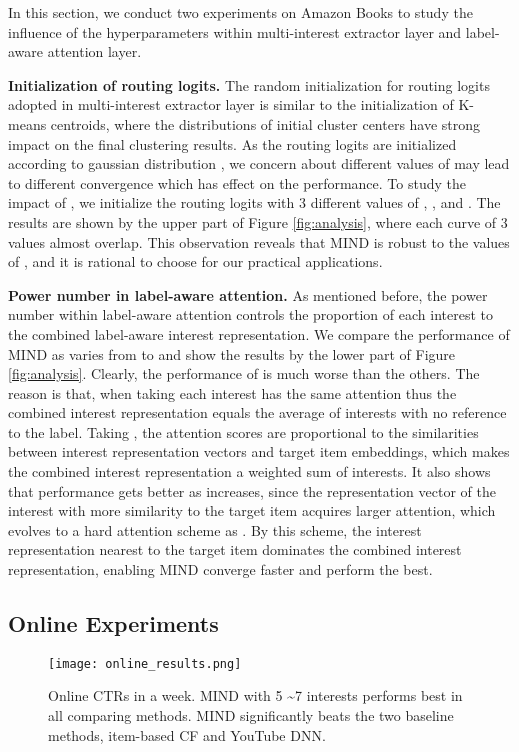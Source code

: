 \documentclass[sigconf]{acmart}
\begin{document}
In this section, we conduct two experiments on Amazon Books to study the influence of the hyperparameters within multi-interest extractor layer and label-aware attention layer.

\textbf{Initialization of routing logits.}
The random initialization for routing logits adopted in multi-interest extractor layer is similar to the initialization of K-means centroids, where the distributions of initial cluster centers have strong impact on the final clustering results.
As the routing logits are initialized according to gaussian distribution , we concern about different values of  may lead to different convergence which has effect on the performance.
To study the impact of , we initialize the routing logits  with 3 different values of , ,  and .
The results are shown by the upper part of Figure \ref{fig:analysis}, where each curve of 3 values almost overlap.
This observation reveals that MIND is robust to the values of , and it is rational to choose  for our practical applications.

\textbf{Power number in label-aware attention.}
As mentioned before, the power number  within label-aware attention controls the proportion of each interest to the combined label-aware interest representation.
We compare the performance of MIND as  varies from  to  and show the results by the lower part of Figure \ref{fig:analysis}.
Clearly, the performance of  is much worse than the others.
The reason is that, when taking  each interest has the same attention thus the combined interest representation equals the average of interests with no reference to the label.
Taking , the attention scores are proportional to the similarities between interest representation vectors and target item embeddings, which makes the combined interest representation a weighted sum of interests.
It also shows that performance gets better as  increases, since the representation vector of the interest with more similarity to the target item acquires larger attention, which evolves to a hard attention scheme as .
By this scheme, the interest representation nearest to the target item dominates the combined interest representation, enabling MIND converge faster and perform the best.

\subsection{Online Experiments}

\begin{figure}[h]
  \centering
  \texttt{[image: online\_results.png]}
  \caption{Online CTRs in a week. MIND with 5 \textasciitilde 7 interests performs best in all comparing methods. MIND significantly beats the two baseline methods, item-based CF and YouTube DNN.}
  \label{fig:online_results}
\end{figure}
\end{document}
